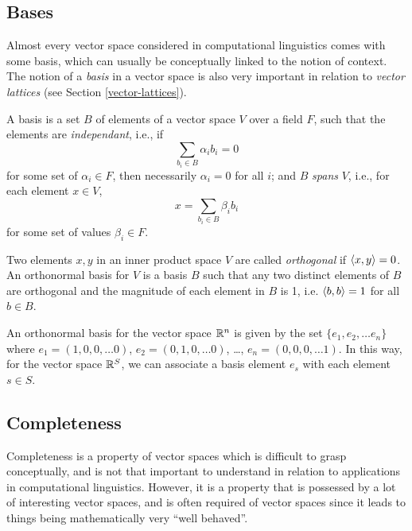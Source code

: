 \subsection{Bases}
\label{basis}

Almost every vector space considered in computational linguistics comes with some basis, which can usually be conceptually linked to the notion of context. The notion of a \emph{basis} in a vector space is also very important in relation to \emph{vector lattices} (see Section \ref{vector-lattices}).

\begin{defn}[Basis]
A basis is a set $B$ of elements of a vector space $V$ over a field $F$, such that the elements are \emph{independant}, i.e., if
$$\sum_{b_i \in B} \alpha_i b_i = 0$$
for some set of $\alpha_i \in F$, then necessarily $\alpha_i = 0$ for all $i$; and $B$ \emph{spans} $V$, i.e., for each element $x \in V$,
$$x = \sum_{b_i \in B} \beta_i b_i$$
for some set of values $\beta_i \in F$.

Two elements $x,y$ in an inner product space $V$ are called \emph{orthogonal} if $\langle x, y \rangle = 0$. An orthonormal basis for $V$ is a basis $B$ such that any two distinct elements of $B$ are orthogonal and the magnitude of each element in $B$ is 1, i.e. $\langle b, b \rangle = 1$ for all $b\in B$.
\end{defn}

\begin{example}
An orthonormal basis for the vector space $\mathbb{R}^n$ is given by the set $\{e_1,e_2,\ldots e_n\}$ where $e_1 = (1,0,0,\dots 0)$, $e_2 = (0,1,0,\dots 0)$, \ldots, $e_n = (0,0,0,\dots 1)$. In this way, for the vector space $\mathbb{R}^S$, we can associate a basis element $e_s$ with each element $s \in S$.
\end{example}

\subsection{Completeness}
\label{completeness-section}

Completeness is a property of vector spaces which is difficult to grasp conceptually, and is not that important to understand in relation to applications in computational linguistics. However, it is a property that is possessed by a lot of interesting vector spaces, and is often required of vector spaces since it leads to things being mathematically very ``well behaved''.

